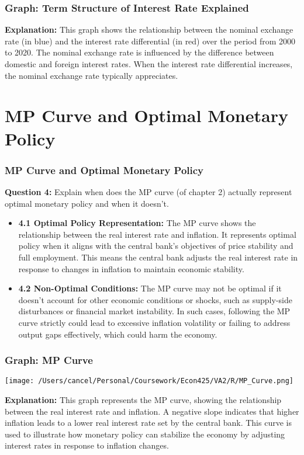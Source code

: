 \documentclass{beamer}
\begin{document}
\begin{frame}
    \frametitle{Graph: Term Structure of Interest Rate Explained}

    \textbf{Explanation:} This graph shows the relationship between the nominal exchange rate (in blue) and the interest rate differential (in red) over the period from 2000 to 2020. The nominal exchange rate is influenced by the difference between domestic and foreign interest rates. When the interest rate differential increases, the nominal exchange rate typically appreciates.
    

\end{frame}

\section{MP Curve and Optimal Monetary Policy}
\begin{frame}
    \frametitle{MP Curve and Optimal Monetary Policy}
    \textbf{Question 4:} Explain when does the MP curve (of chapter 2) actually represent optimal monetary policy and when it doesn’t.
    \begin{itemize}
        \item \textbf{4.1 Optimal Policy Representation:} The MP curve shows the relationship between the real interest rate and inflation. It represents optimal policy when it aligns with the central bank's objectives of price stability and full employment. This means the central bank adjusts the real interest rate in response to changes in inflation to maintain economic stability.
        \item \textbf{4.2 Non-Optimal Conditions:} The MP curve may not be optimal if it doesn't account for other economic conditions or shocks, such as supply-side disturbances or financial market instability. In such cases, following the MP curve strictly could lead to excessive inflation volatility or failing to address output gaps effectively, which could harm the economy.
    \end{itemize}
\end{frame}

\begin{frame}
    \frametitle{Graph: MP Curve}
    \begin{center}
        \texttt{[image: /Users/cancel/Personal/Coursework/Econ425/VA2/R/MP\_Curve.png]}
    \end{center}
    \textbf{Explanation:} This graph represents the MP curve, showing the relationship between the real interest rate and inflation. A negative slope indicates that higher inflation leads to a lower real interest rate set by the central bank. This curve is used to illustrate how monetary policy can stabilize the economy by adjusting interest rates in response to inflation changes.
\end{frame}
\end{document}
